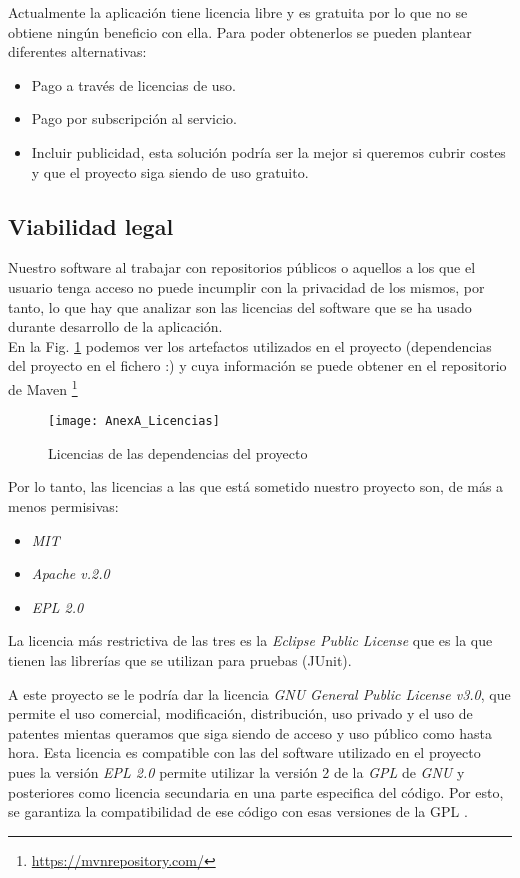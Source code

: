 Actualmente la aplicación tiene licencia libre y es gratuita por lo que no se obtiene ningún beneficio con ella. Para poder obtenerlos se pueden plantear diferentes alternativas:

\begin{itemize}
	\item Pago a través de licencias de uso.
	\item Pago por subscripción al servicio.
	\item Incluir publicidad, esta solución podría ser la mejor si queremos cubrir costes y que el proyecto siga siendo de uso gratuito.
\end{itemize}


\subsection{Viabilidad legal}
Nuestro software al trabajar con repositorios públicos o aquellos a los que el usuario tenga acceso no puede incumplir con la privacidad de los mismos, por tanto, lo que hay que analizar son las licencias del software que se ha usado durante desarrollo de la aplicación.\\
 En la Fig. \ref{fig:AnexA_Licencias} podemos ver los artefactos utilizados en el proyecto (dependencias del proyecto en el fichero :) y cuya información se puede obtener en el repositorio de Maven \footnote{\url{https://mvnrepository.com/}} 

\begin{figure}[!h]
	\centering
	\texttt{[image: AnexA\_Licencias]}
	\caption{Licencias de las dependencias del proyecto}
	\label{fig:AnexA_Licencias}
\end{figure}
\FloatBarrier

Por lo tanto, las licencias a las que está sometido nuestro proyecto son, de más a menos permisivas:
\begin{itemize}
	\item \textit{MIT}
	\item \textit{Apache v.2.0}
	\item \textit{EPL 2.0}
\end{itemize}

La licencia más restrictiva de las tres es la \textit{Eclipse Public License} que es la que tienen las librerías que se utilizan para pruebas (JUnit).

A este proyecto se le podría dar la licencia \textit{GNU General Public License v3.0}, que permite el uso comercial, modificación, distribución, uso privado y el uso de patentes mientas queramos que siga siendo de acceso y uso público como hasta hora.
Esta licencia es compatible con las del software utilizado en el proyecto pues la versión \textit{EPL 2.0} permite utilizar la versión 2 de la \textit{GPL} de \textit{GNU} y posteriores como licencia secundaria en una parte especifica del código. Por esto, se garantiza la compatibilidad de ese código con esas versiones de la GPL \cite{santiago_lista_2019}.